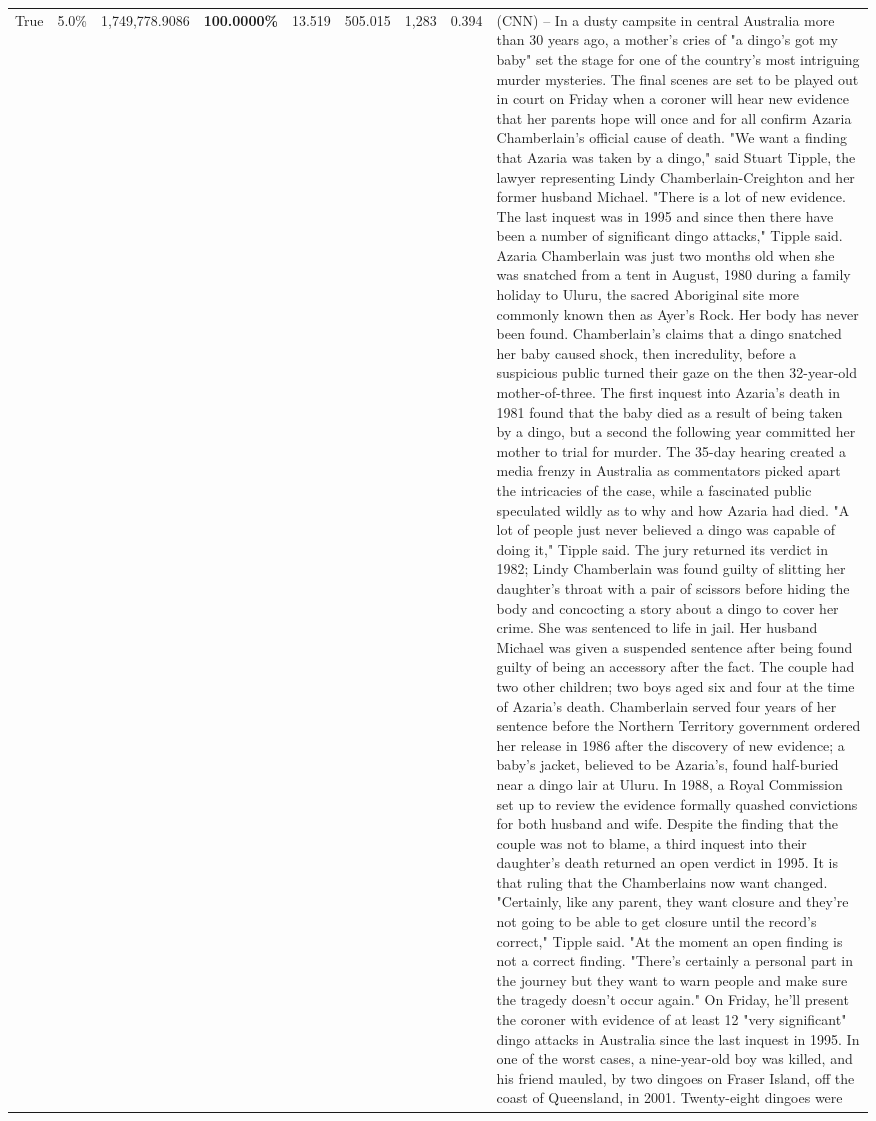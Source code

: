 \begin{table}[H]
\begin{tabular}{lllrlllll}
True & 5.0\% & 1,749,778.9086 & \bfseries \color{red} 100.0000\% & 13.519 & 505.015 & 1,283 & 0.394 & (CNN) -- In a dusty campsite in central Australia more than 30 years ago, a mother's cries of "a dingo's got my baby" set the stage for one of the country's most intriguing murder mysteries. The final scenes are set to be played out in court on Friday when a coroner will hear new evidence that her parents hope will once and for all confirm Azaria Chamberlain's official cause of death. "We want a finding that Azaria was taken by a dingo," said Stuart Tipple, the lawyer representing Lindy Chamberlain-Creighton and her former husband Michael. "There is a lot of new evidence. The last inquest was in 1995 and since then there have been a number of significant dingo attacks," Tipple said. Azaria Chamberlain was just two months old when she was snatched from a tent in August, 1980 during a family holiday to Uluru, the sacred Aboriginal site more commonly known then as Ayer's Rock. Her body has never been found. Chamberlain's claims that a dingo snatched her baby caused shock, then incredulity, before a suspicious public turned their gaze on the then 32-year-old mother-of-three. The first inquest into Azaria's death in 1981 found that the baby died as a result of being taken by a dingo, but a second the following year committed her mother to trial for murder. The 35-day hearing created a media frenzy in Australia as commentators picked apart the intricacies of the case, while a fascinated public speculated wildly as to why and how Azaria had died. "A lot of people just never believed a dingo was capable of doing it," Tipple said. The jury returned its verdict in 1982; Lindy Chamberlain was found guilty of slitting her daughter's throat with a pair of scissors before hiding the body and concocting a story about a dingo to cover her crime. She was sentenced to life in jail. Her husband Michael was given a suspended sentence after being found guilty of being an accessory after the fact. The couple had two other children; two boys aged six and four at the time of Azaria's death. Chamberlain served four years of her sentence before the Northern Territory government ordered her release in 1986 after the discovery of new evidence; a baby's jacket, believed to be Azaria's, found half-buried near a dingo lair at Uluru. In 1988, a Royal Commission set up to review the evidence formally quashed convictions for both husband and wife. Despite the finding that the couple was not to blame, a third inquest into their daughter's death returned an open verdict in 1995. It is that ruling that the Chamberlains now want changed. "Certainly, like any parent, they want closure and they're not going to be able to get closure until the record's correct," Tipple said. "At the moment an open finding is not a correct finding. "There's certainly a personal part in the journey but they want to warn people and make sure the tragedy doesn't occur again." On Friday, he'll present the coroner with evidence of at least 12 "very significant" dingo attacks in Australia since the last inquest in 1995. In one of the worst cases, a nine-year-old boy was killed, and his friend mauled, by two dingoes on Fraser Island, off the coast of Queensland, in 2001. Twenty-eight dingoes were 
\end{tabular}
\end{table}
